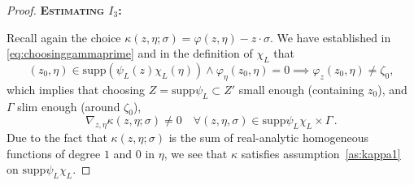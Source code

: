 \documentclass[
	fontsize=11pt, 
	twoside=false, 
	abstract=true, 
	a4paper,
]{scrartcl}
\newcommand{\dd}{\mathrm{d}}
\newcommand{\abs}[1]{\left\lvert#1\right\rvert}
\newcommand{\supp}{\mathrm{supp}}
\newcommand{\es}{\mathrm{ess}\ \mathrm{supp}}
\newcommand{\bsc}[1]{\textbf{\ebgaramond\textsc{#1}}}
\begin{document}
\begin{proof}

	\bsc{Estimating $I_3$:}

	Recall again the choice $\kappa(z,\eta;\sigma) = \varphi(z,\eta)-z\cdot\sigma$. We have established in \cref{eq:choosinggammaprime} and in the definition of $\chi_L$ that
	\[
		(z_0,\eta) \in \supp (\psi_L(z)\chi_L(\eta)) \wedge \varphi_\eta(z_0,\eta) = 0 \implies \varphi_z(z_0,\eta) \neq \zeta_0,
	\]
	which implies that choosing $Z = \supp \psi_L \subset Z'$ small enough (containing $z_0$), and $\Gamma$ slim enough (around $\zeta_0$),
	\[
		\nabla_{z,\eta}\kappa(z,\eta;\sigma) \neq 0 \quad \forall (z,\eta,\sigma) \in \supp \psi_L\chi_L \times \Gamma\,.
	\]
	Due to the fact that $\kappa(z,\eta;\sigma)$ is the sum of real-analytic homogeneous functions of degree $1$ and $0$ in $\eta$, we see that $\kappa$ satisfies assumption~\ref{as:kappa1} on $\supp \psi_L\chi_L$. 


\end{proof}
\end{document}
